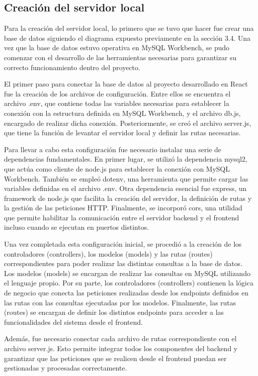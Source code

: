\subsection{Creación del servidor local}
\label{subsec:creacion_servidor_local}

Para la creación del servidor local, lo primero que se tuvo que hacer fue crear una base de datos siguiendo el diagrama expuesto previamente en la sección 3.4. Una vez que la base de datos estuvo operativa en MySQL Workbench, se pudo comenzar con el desarrollo de las herramientas necesarias para garantizar su correcto funcionamiento dentro del proyecto.

El primer paso para conectar la base de datos al proyecto desarrollado en React fue la creación de los archivos de configuración. Entre ellos se encuentra el archivo .env, que contiene todas las variables necesarias para establecer la conexión con la estructura definida en MySQL Workbench, y el archivo db.js, encargado de realizar dicha conexión. Posteriormente, se creó el archivo server.js, que tiene la función de levantar el servidor local y definir las rutas necesarias.

Para llevar a cabo esta configuración fue necesario instalar una serie de dependencias fundamentales. En primer lugar, se utilizó la dependencia mysql2, que actúa como cliente de node.js para establecer la conexión con MySQL Workbench. También se empleó dotenv, una herramienta que permite cargar las variables definidas en el archivo .env. Otra dependencia esencial fue express, un framework de node.js que facilita la creación del servidor, la definición de rutas y la gestión de las peticiones HTTP. Finalmente, se incorporó cors, una utilidad que permite habilitar la comunicación entre el servidor backend y el frontend incluso cuando se ejecutan en puertos distintos.

Una vez completada esta configuración inicial, se procedió a la creación de los controladores (controllers), los modelos (models) y las rutas (routes) correspondientes para poder realizar las distintas consultas a la base de datos. Los modelos (models) se encargan de realizar las consultas en MySQL utilizando el lenguaje propio. Por su parte, los controladores (controllers) contienen la lógica de negocio que conecta las peticiones realizadas desde los endpoints definidos en las rutas con las consultas ejecutadas por los modelos. Finalmente, las rutas (routes) se encargan de definir los distintos endpoints para acceder a las funcionalidades del sistema desde el frontend.

Además, fue necesario conectar cada archivo de rutas correspondiente con el archivo server.js. Esto permite integrar todos los componentes del backend y garantizar que las peticiones que se realicen desde el frontend puedan ser gestionadas y procesadas correctamente.
